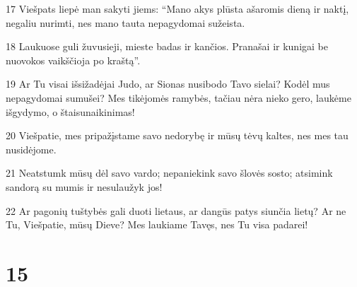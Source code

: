 \par 17 Viešpats liepė man sakyti jiems: “Mano akys plūsta ašaromis dieną ir naktį, negaliu nurimti, nes mano tauta nepagydomai sužeista. 
\par 18 Laukuose guli žuvusieji, mieste badas ir kančios. Pranašai ir kunigai be nuovokos vaikščioja po kraštą”. 
\par 19 Ar Tu visai išsižadėjai Judo, ar Sionas nusibodo Tavo sielai? Kodėl mus nepagydomai sumušei? Mes tikėjomės ramybės, tačiau nėra nieko gero, laukėme išgydymo, o štai­sunaikinimas! 
\par 20 Viešpatie, mes pripažįstame savo nedorybę ir mūsų tėvų kaltes, nes mes tau nusidėjome. 
\par 21 Neatstumk mūsų dėl savo vardo; nepaniekink savo šlovės sosto; atsimink sandorą su mumis ir nesulaužyk jos! 
\par 22 Ar pagonių tuštybės gali duoti lietaus, ar dangūs patys siunčia lietų? Ar ne Tu, Viešpatie, mūsų Dieve? Mes laukiame Tavęs, nes Tu visa padarei!



\chapter{15}


